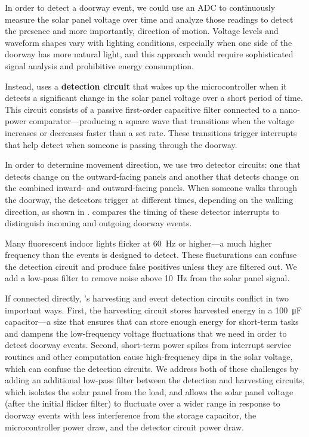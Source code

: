 In order to detect a doorway event, we could use an ADC to continuously measure the solar panel voltage over time and analyze those readings to detect the presence and more importantly, direction of motion.
Voltage levels and waveform shapes vary with lighting conditions, especially when one side of the doorway has more natural light, and this approach would require sophisticated signal analysis and prohibitive energy consumption.

Instead, \sysname uses a \textbf{detection circuit} that wakes up the microcontroller when it detects a significant change in the solar panel voltage over a short period of time.
This circuit consists of a passive first-order capacitive filter connected to a nano-power comparator---producing a square wave that transitions when the voltage increases or decreases faster than a set rate.
These transitions trigger interrupts that help \sysname detect when someone is passing through the doorway.

In order to determine movement direction, we use two detector circuits: one that detects change on the outward-facing panels and another that detects change on the combined inward- and outward-facing panels.
When someone walks through the doorway, the detectors trigger at different times, depending on the walking direction, as shown in .
\sysname compares the timing of these detector interrupts to distinguish incoming and outgoing doorway events.


Many fluorescent indoor lights flicker at \SI{60}{\hertz} or higher---a much higher frequency than the events \sysname is designed to detect.
These flucturations can confuse the detection circuit and produce false positives unless they are filtered out.
We add a low-pass filter to remove noise above \SI{10}{\hertz} from the solar panel signal.

If connected directly, \sysname's harvesting and event detection circuits conflict in two important ways.
First, the harvesting circuit stores harvested energy in a \SI{100}{\micro\farad} capacitor---a size that ensures that \sysname can store enough energy for short-term tasks and dampens the low-frequency voltage fluctuations that we need in order to detect doorway events.
Second, short-term power spikes from interrupt service routines and other computation cause high-frequency dips in the solar voltage, which can confuse the detection circuits.
We address both of these challenges by adding an additional low-pass filter between the detection and harvesting circuits, which isolates the solar panel from the load, and allows the solar panel voltage (after the initial flicker filter) to fluctuate over a wider range in response to doorway events with less interference from the storage capacitor, the microcontroller power draw, and the detector circuit power draw.


